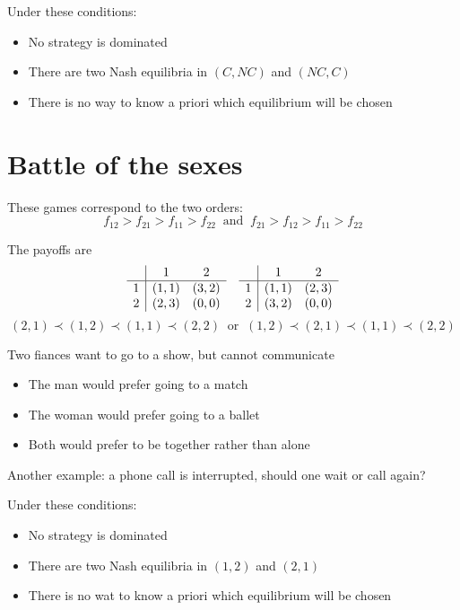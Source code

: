 Under these conditions: 
\begin{itemize}
	\item No strategy is dominated
	
	\item There are two Nash equilibria in $(C, NC)$ and $(NC, C)$
	
	\item There is no way to know a priori which equilibrium will be chosen
\end{itemize}

\section{Battle of the sexes}

These games correspond to the two orders:
$$ f_{12} > f_{21} > f_{11} > f_{22} \ \text{ and } \ f_{21} > f_{12} > f_{11} > f_{22} $$

The payoffs are
$$
\begin{array}{c | c c}
	& 1& 2 \\
	\hline
	1 & (1,1) & (3, 2) \\
	2 & (2,3) & (0,0)
\end{array}
\quad
\begin{array}{c | c c}
	& 1& 2 \\
	\hline
	1 & (1,1) & (2, 3) \\
	2 & (3,2) & (0,0)
\end{array}
$$
$$ (2, 1) \prec (1, 2) \prec (1, 1) \prec (2, 2) \ \text{ or } \ (1,2) \prec (2, 1) \prec (1, 1) \prec (2, 2)  $$

Two fiances want to go to a show, but cannot communicate
\begin{itemize}
	\item The man would prefer going to a match
	
	\item The woman would prefer going to a ballet
	
	\item Both would prefer to be together rather than alone
\end{itemize}
Another example: a phone call is interrupted, should one wait or call again? 

Under these conditions: 
\begin{itemize}
	\item No strategy is dominated
	
	\item There are two Nash equilibria in $(1, 2)$ and $(2, 1)$
	
	\item There is no wat to know a priori which equilibrium will be chosen 
\end{itemize}


